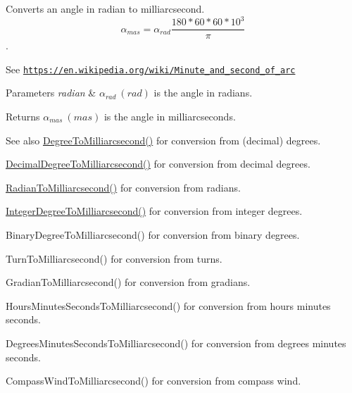 Converts an angle in radian to milliarcsecond. \[\alpha_{mas}=\alpha_{rad}\frac{180 * 60 * 60 * 10^3}{\pi}\]. 

See \href{https://en.wikipedia.org/wiki/Minute_and_second_of_arc}{\tt https\+://en.\+wikipedia.\+org/wiki/\+Minute\+\_\+and\+\_\+second\+\_\+of\+\_\+arc} 
\begin{DoxyParams}{Parameters}
{\em radian} & $\alpha_{rad}\ (rad)$ is the angle in radians. \\
\hline
\end{DoxyParams}
\begin{DoxyReturn}{Returns}
$\alpha_{mas}\ (mas)$ is the angle in milliarcseconds. 
\end{DoxyReturn}
\begin{DoxySeeAlso}{See also}
\mbox{\hyperlink{group___e_g_x_math-_angle_conversions-_degree_ga2c218e286b2ef72a00734dbc5a7f5ab6}{Degree\+To\+Milliarcsecond()}} for conversion from (decimal) degrees. 

\mbox{\hyperlink{group___e_g_x_math-_angle_conversions-_decimal_degree_gadb9ff3c92cf7484793f91e7de80c222e}{Decimal\+Degree\+To\+Milliarcsecond()}} for conversion from decimal degrees. 

\mbox{\hyperlink{group___e_g_x_math-_angle_conversions-_radian_ga84fbb494a455cfeb30be62776f96c9a9}{Radian\+To\+Milliarcsecond()}} for conversion from radians. 

\mbox{\hyperlink{group___e_g_x_math-_angle_conversions-_integer_degree_gadc43f22e832cd8fcf16b7bd2269ae348}{Integer\+Degree\+To\+Milliarcsecond()}} for conversion from integer degrees. 

Binary\+Degree\+To\+Milliarcsecond() for conversion from binary degrees. 

Turn\+To\+Milliarcsecond() for conversion from turns. 

Gradian\+To\+Milliarcsecond() for conversion from gradians. 

Hours\+Minutes\+Seconds\+To\+Milliarcsecond() for conversion from hours minutes seconds. 

Degrees\+Minutes\+Seconds\+To\+Milliarcsecond() for conversion from degrees minutes seconds. 

Compass\+Wind\+To\+Milliarcsecond() for conversion from compass wind. 
\end{DoxySeeAlso}
\mbox{\label{group___e_g_x_math-_angle_conversions-_radian_gaea391f0cca39b05e298dd1cae162e7f1}} 
